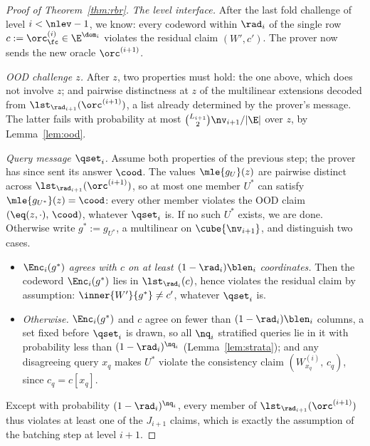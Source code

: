 \begin{proof}[Proof of Theorem~\ref{thm:rbr}]
\medskip\noindent\emph{The level interface.}
After the last fold challenge of level $i < \nlev - 1$, we know: every codeword within $\rad_i$ of the single row $c := \orc^{(i)}_\fc \in \E^{\dom_i}$ violates the residual claim $(W', c')$. The prover now sends the new oracle $\orc^{(i+1)}$.

\medskip\noindent\emph{OOD challenge $z$.}
After $z$, two properties must hold: the one above, which does not involve $z$; and pairwise distinctness at $z$ of the multilinear extensions decoded from $\lst_{\rad_{i+1}}(\orc^{(i+1)})$, a list already determined by the prover's message. The latter fails with probability at most $\binom{L_{i+1}}{2} \nv_{i+1} / |\E|$ over $z$, by Lemma~\ref{lem:ood}.

\medskip\noindent\emph{Query message $\qset_i$.}
Assume both properties of the previous step; the prover has since sent its answer $\cood$. The values $\mle{g_U}(z)$ are pairwise distinct across $\lst_{\rad_{i+1}}(\orc^{(i+1)})$, so at most one member $U^\ast$ can satisfy $\mle{g_{U^\ast}}(z) = \cood$: every other member violates the OOD claim $(\eq(z, \cdot),\, \cood)$, whatever $\qset_i$ is. If no such $U^\ast$ exists, we are done. Otherwise write $g^\ast := g_{U^\ast}$, a multilinear on $\cube{\nv_{i+1}}$, and distinguish two cases.
\begin{itemize}[itemsep=1pt]
\item \emph{$\Enc_i(g^\ast)$ agrees with $c$ on at least $(1 - \rad_i) \blen_i$ coordinates.} Then the codeword $\Enc_i(g^\ast)$ lies in $\lst_{\rad_i}(c)$, hence violates the residual claim by assumption: $\inner{W'}{g^\ast} \neq c'$, whatever $\qset_i$ is.
\item \emph{Otherwise.} $\Enc_i(g^\ast)$ and $c$ agree on fewer than $(1 - \rad_i)\blen_i$ columns, a set fixed before $\qset_i$ is drawn, so all $\nq_i$ stratified queries lie in it with probability less than $(1 - \rad_i)^{\nq_i}$ (Lemma~\ref{lem:strata}); and any disagreeing query $x_q$ makes $U^\ast$ violate the consistency claim $(W^{(i)}_{x_q},\, c_q)$, since $c_q = c[x_q]$.
\end{itemize}
Except with probability $(1 - \rad_i)^{\nq_i}$, every member of $\lst_{\rad_{i+1}}(\orc^{(i+1)})$ thus violates at least one of the $J_{i+1}$ claims, which is exactly the assumption of the batching step at level $i + 1$.


\end{proof}
